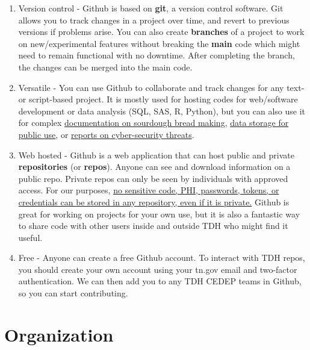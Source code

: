 \documentclass[
  letterpaper,
  DIV=11,
  numbers=noendperiod]{scrreprt}
\begin{document}
\begin{enumerate}
\def\labelenumi{\arabic{enumi}.}
\item
  Version control - Github is based on \textbf{git}, a version control
  software. Git allows you to track changes in a project over time, and
  revert to previous versions if problems arise. You can also create
  \textbf{branches} of a project to work on new/experimental features
  without breaking the \textbf{main} code which might need to remain
  functional with no downtime. After completing the branch, the changes
  can be merged into the main code.
\item
  Versatile - You can use Github to collaborate and track changes for
  any text- or script-based project. It is mostly used for hosting codes
  for web/software development or data analysis (SQL, SAS, R, Python),
  but you can also use it for complex
  \href{https://github.com/hendricius/the-sourdough-framework}{documentation
  on sourdough bread making},
  \href{https://github.com/sfu-db/covid19-datasets/tree/master}{data
  storage for public use}, or
  \href{https://github.com/jacobdjwilson/awesome-annual-security-reports}{reports
  on cyber-security threats}.
\item
  Web hosted - Github is a web application that can host public and
  private \textbf{repositories} (or \textbf{repos}). Anyone can see and
  download information on a public repo. Private repos can only be seen
  by individuals with approved access. For our purposes, \ul{no
  sensitive code, PHI, passwords, tokens, or credentials can be stored
  in any repository, even if it is private.} Github is great for working
  on projects for your own use, but it is also a fantastic way to share
  code with other users inside and outside TDH who might find it useful.
\item
  Free - Anyone can create a free Github account. To interact with TDH
  repos, you should create your own account using your tn.gov email and
  two-factor authentication. We can then add you to any TDH CEDEP teams
  in Github, so you can start contributing.
\end{enumerate}

\hypertarget{organization}{%
\section*{Organization}\label{organization}}

\end{document}
